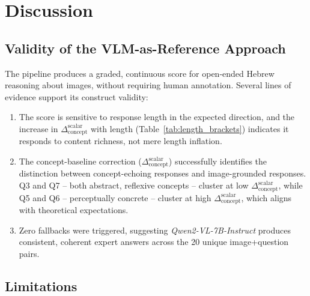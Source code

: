 \documentclass[12pt,a4paper]{article}
\newcommand{\vlm}{\textsc{VLM}}
\newcommand{\SACs}{\ensuremath{\Delta_{\text{concept}}^{\text{scalar}}}}
\newcommand{\Qwen}{\textit{Qwen2-VL-7B-Instruct}}
\begin{document}
\section{Discussion}

\subsection{Validity of the \vlm{}-as-Reference Approach}

The pipeline produces a graded, continuous score for open-ended Hebrew reasoning about
images, without requiring human annotation.  Several lines of evidence support its
construct validity:

\begin{enumerate}
  \item The score is sensitive to response length in the expected direction, and the
        increase in \SACs{} with length (Table~\ref{tab:length_brackets}) indicates it
        responds to content richness, not mere length inflation.
  \item The concept-baseline correction (\SACs{}) successfully identifies the distinction
        between concept-echoing responses and image-grounded responses.  Q3 and Q7 --
        both abstract, reflexive concepts -- cluster at low \SACs{}, while Q5 and Q6 --
        perceptually concrete -- cluster at high \SACs{}, which aligns with theoretical
        expectations.
  \item Zero fallbacks were triggered, suggesting \Qwen{} produces consistent,
        coherent expert answers across the 20 unique image+question pairs.
\end{enumerate}

\subsection{Limitations}
\end{document}
